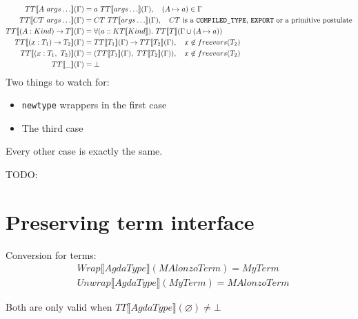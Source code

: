 \begin{align*}
   TT\llbracket A\ args\ldots \rrbracket(\Gamma) &= a\ TT\llbracket args\ldots \rrbracket(\Gamma),
      \quad (A \mapsto a) \in \Gamma \\
   TT\llbracket CT\ args\ldots \rrbracket(\Gamma) &= CT\ TT\llbracket args\ldots \rrbracket(\Gamma),
      \quad CT\text{ is a \texttt{COMPILED\_TYPE}, \texttt{EXPORT} or a primitive postulate}\\
   TT\llbracket (A : Kind) \rightarrow T \rrbracket(\Gamma) &= \forall (a :: KT\llbracket Kind \rrbracket).
      \ TT\llbracket T \rrbracket(\Gamma \cup (A \mapsto a))\\
   TT\llbracket (x : T_1) \rightarrow T_2 \rrbracket(\Gamma) &=
      TT\llbracket T_1 \rrbracket(\Gamma) \rightarrow TT\llbracket T_2 \rrbracket(\Gamma),
      \quad x \not\in freevars(T_2) \\
   TT\llbracket (x : T_1,\ T_2) \rrbracket(\Gamma) &=
      (TT\llbracket T_1 \rrbracket(\Gamma),\ TT\llbracket T_2 \rrbracket(\Gamma)),
      \quad x \not\in freevars(T_2) \\
   TT\llbracket \_ \rrbracket(\Gamma) &= \bot\\
\end{align*}
Two things to watch for:
\begin{itemize}
\item \texttt{newtype} wrappers in the first case
\item The third case
\end{itemize}
Every other case is exactly the same.

TODO:

\section{Preserving term interface}

Conversion for terms:
\begin{align*}
   &Wrap\llbracket AgdaType \rrbracket(MAlonzoTerm) = MyTerm\\
   &Unwrap\llbracket AgdaType \rrbracket(MyTerm) = MAlonzoTerm
\end{align*}

Both are only valid when \(TT\llbracket AgdaType \rrbracket(\varnothing) \neq \bot\)

